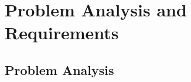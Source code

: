 \section{Problem Analysis and Requirements}


\subsection{Problem Analysis}
\label{problem_analysis}


